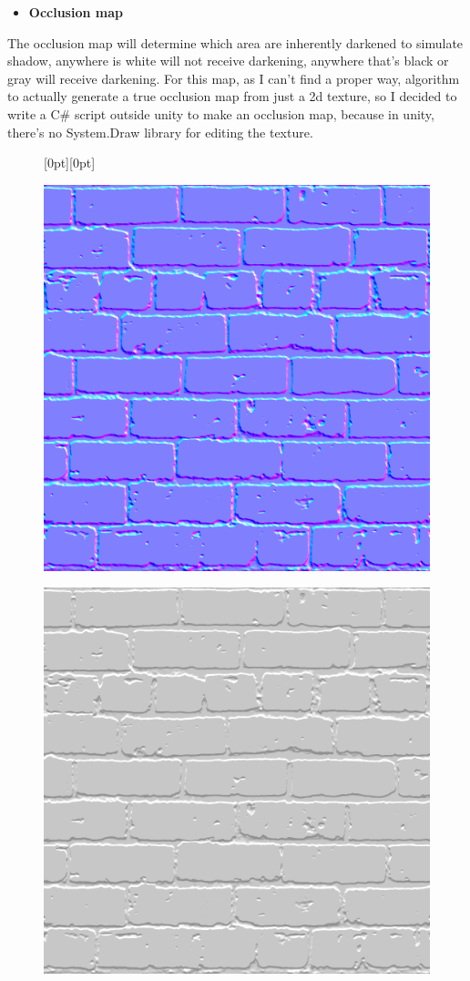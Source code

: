 \documentclass[a4paper, 13pt]{extarticle}
\begin{document}
{\begin{itemize}
	\item \bfseries Occlusion map	 	
\end{itemize}
The occlusion map will determine which area are inherently darkened to simulate shadow, anywhere is white will not receive darkening, anywhere that's black or gray will receive darkening. For this map, as I can't find a proper way, algorithm to actually generate a true occlusion map from just a 2d texture, so I decided to write a C\# script outside unity to make an occlusion map, because in unity, there's no System.Draw library for editing the texture.
\newpage
\begin{figure}[h]
	\centering
	\raisebox{-25mm}[0pt][0pt]{
		\begin{minipage}{.4\textwidth}
			\centering
			\includegraphics[width=0.8\linewidth]{intructions/Brick001_n.png}
			\centering
			\label{fig:test22}
		\end{minipage}
		\begin{minipage}{.4\textwidth}
			\centering
			\includegraphics[width=0.8\linewidth]{intructions/Brick001_occ.png}

\end{minipage}}
\end{figure}}
\end{document}
